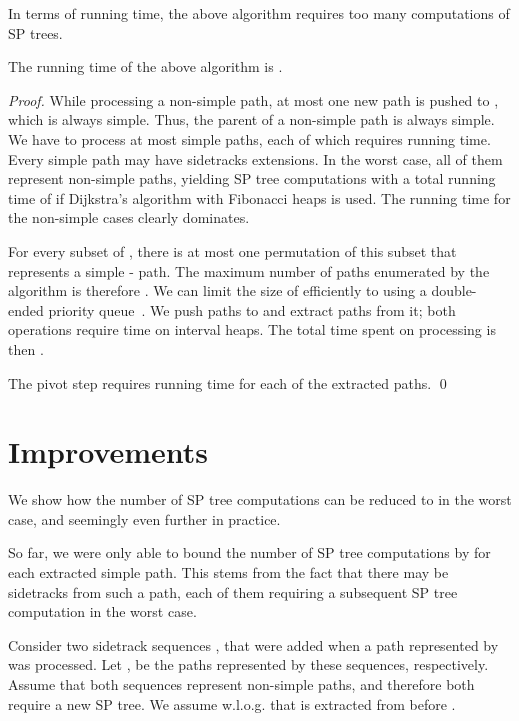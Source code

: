 \documentclass[runningheads,a4paper]{llncs}
\begin{document}
In terms of running time, the above algorithm requires too many computations of SP trees.

\begin{lemma}
	The running time of the above algorithm is .
\end{lemma}
\begin{proof}
	While processing a non-simple path, at most one new path is pushed to , which is always simple.
	Thus, the parent of a non-simple path is always simple.
    We have to process at most  simple paths, each of which requires  running time.
	Every simple path may have  sidetracks extensions.
	In the worst case, all of them represent non-simple paths, yielding  SP tree computations with a total running time of  if Dijkstra's algorithm with Fibonacci heaps is used.
	The running time for the non-simple cases clearly dominates.

	For every subset of , there is at most one permutation of this subset that represents a simple - path.
    The maximum number of paths enumerated by the algorithm is therefore .
    We can limit the size of  efficiently to  using a double-ended priority queue~\cite{CUSTOM:book/sahni1999}.
    We push  paths to  and extract  paths from it; both operations require  time on interval heaps.
    The total time spent on processing  is then .

    The pivot step requires  running time for each of the  extracted paths.
    \qed
\end{proof}


\section{Improvements}
\label{sec:improve}

We show how the number of SP tree computations can be reduced to  in the worst case, and seemingly even further in practice.

So far, we were only able to bound the number of SP tree computations by  for each extracted simple path.
This stems from the fact that there may be  sidetracks from such a path, each of them requiring a subsequent SP tree computation in the worst case.

Consider two sidetrack sequences ,  that were added when a path  represented by  was processed.
Let ,  be the paths represented by these sequences, respectively.
Assume that both sequences represent non-simple paths, and therefore both require a new SP tree.
We assume w.l.o.g. that  is extracted from  before .
\end{document}
